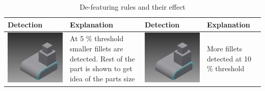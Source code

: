 \begin{longtable}{ | C{0.25\textwidth}  L{0.25\textwidth} || C{0.25\textwidth}  L{0.25\textwidth}|}
\caption{De-featuring rules and their effect}\\
\hline
{\bf Detection} & {\bf Explanation} & {\bf Detection} & {\bf Explanation}\\
\hline
\hline

\includegraphics[scale=0.236]{..//Common/images//defeat1.png} &
At 5 \% threshold smaller fillets are detected. Rest of the part is shown to get idea of the parts size &
\includegraphics[scale=0.236]{..//Common/images//defeat2.png} &
More fillets detected at 10 \% threshold\\



\end{longtable}
